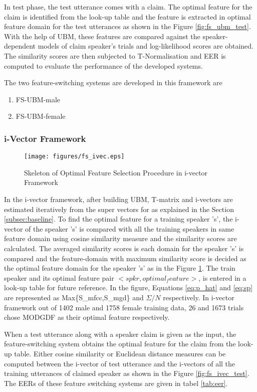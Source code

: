 \documentclass{article}
\begin{document}
In test phase, the test utterance comes with a claim. The optimal feature for the claim is identified from the look-up table and the feature is extracted in optimal feature domain for the test utterances as shown in the Figure \ref{fig:fs_ubm_test}. With the help of UBM, these features are compared against the speaker-dependent models of claim speaker's trials and log-likelihood scores are obtained. The similarity scores are then subjected to T-Normalisation and EER is computed to evaluate the performance of the developed systems. 

The two feature-switching systems are developed in this framework are
\begin{enumerate}
\item FS-UBM-male 
\item FS-UBM-female
\end{enumerate}


\subsubsection{i-Vector Framework}
\label{subsubsec:fs_ivec} 

\begin{figure}[h!tb]
\texttt{[image: figures/fs\_ivec.eps]}
\caption{Skeleton of Optimal Feature Selection Procedure in i-vector Framework}
\label{fig:fs_ivec}
\end{figure}

In the i-vector framework, after building UBM, T-matrix and i-vectors are estimated iteratively from the super vectors for  as explained in the Section \ref{subsec:baseline}. To find the optimal feature for a training speaker 's', the i-vector of the speaker 's' is compared with all the training speakers in same feature domain using cosine similarity measure and the similarity scores are calculated. The averaged similarity scores is each domain for the speaker 's' is compared and the feature-domain with maximum similarity score is decided as the optimal feature domain for the speaker 's' as in the Figure \ref{fig:fs_ivec}. The train speaker and its optimal feature pair $<spkr, optimal_feature>$, is entered in a look-up table for future reference. In the figure, Equations \ref{eq:p_hat} and \ref{eq:sp} are represented as Max\{S\_mfcc,S\_mgd\} and $\Sigma/N$ respectively. In i-vector framework out of 1402 male and 1758 female training data, 26 and 1673 trials chose MODGDF as their optimal feature respectively.

When a test utterance along with a speaker claim is given as the input, the feature-switching system obtains the optimal feature for the claim from the look-up table. Either cosine similarity or Euclidean distance measures can be computed between the i-vector of test utterance and the i-vectors of all the training utterances of claimed speaker as shown in the Figure \ref{fig:fs_ivec_test}. The EERs of these feature switching systems are given in tabel \ref{tab:eer}.
\end{document}
